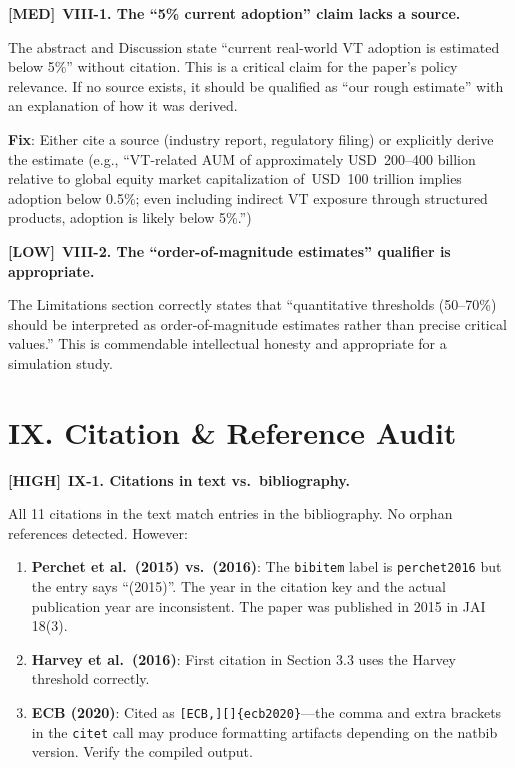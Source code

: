 \documentclass[12pt,a4paper]{article}
\newcommand{\HIGH}{\textbf{\textcolor{errorred}{[HIGH]}}}
\newcommand{\MED}{\textbf{\textcolor{warncolor}{[MED]}}}
\newcommand{\LOW}{\textbf{\textcolor{okgreen}{[LOW]}}}
\begin{document}
\MED\ \textbf{VIII-1. The ``5\% current adoption'' claim lacks a source.}

The abstract and Discussion state ``current real-world VT adoption is estimated below 5\%'' without citation. This is a critical claim for the paper's policy relevance. If no source exists, it should be qualified as ``our rough estimate'' with an explanation of how it was derived.

\textbf{Fix}: Either cite a source (industry report, regulatory filing) or explicitly derive the estimate (e.g., ``VT-related AUM of approximately USD~200--400 billion relative to global equity market capitalization of~USD~100 trillion implies adoption below 0.5\%; even including indirect VT exposure through structured products, adoption is likely below 5\%.'')

\medskip

\LOW\ \textbf{VIII-2. The ``order-of-magnitude estimates'' qualifier is appropriate.}

The Limitations section correctly states that ``quantitative thresholds (50--70\%) should be interpreted as order-of-magnitude estimates rather than precise critical values.'' This is commendable intellectual honesty and appropriate for a simulation study.


\section*{IX. Citation \& Reference Audit}

\HIGH\ \textbf{IX-1. Citations in text vs.\ bibliography.}

All 11 citations in the text match entries in the bibliography. No orphan references detected. However:

\begin{enumerate}[label=(\alph*)]
  \item \textbf{Perchet et al.\ (2015) vs.\ (2016)}: The \texttt{bibitem} label is \texttt{perchet2016} but the entry says ``(2015)''. The year in the citation key and the actual publication year are inconsistent. The paper was published in 2015 in JAI 18(3).
  \item \textbf{Harvey et al.\ (2016)}: First citation in Section 3.3 uses the Harvey threshold correctly.
  \item \textbf{ECB (2020)}: Cited as \texttt{[ECB,][]\{ecb2020\}}---the comma and extra brackets in the \texttt{citet} call may produce formatting artifacts depending on the natbib version. Verify the compiled output.
\end{enumerate}
\end{document}
